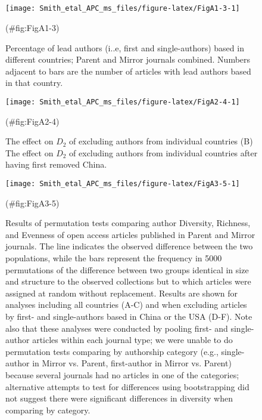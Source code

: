 \clearpage
\makeatletter
\efloat@restorefloats
\makeatother


\begin{appendix}
\section{}
\begin{figure}

{\centering \texttt{[image: Smith\_etal\_APC\_ms\_files/figure-latex/FigA1-3-1]} 

}

\caption{Percentage of lead authors (i..e, first and single-authors) based in different countries; Parent and Mirror journals combined. Numbers adjacent to bars are the number of articles with lead authors based in that country.}(\#fig:FigA1-3)
\end{figure}

\newpage
\blandscape

\begin{figure}

{\centering \texttt{[image: Smith\_etal\_APC\_ms\_files/figure-latex/FigA2-4-1]} 

}

\caption{The effect on $D_{2}$ of excluding authors from individual countries (B) The effect on $D_{2}$ of excluding authors from individual countries after having first removed China.}(\#fig:FigA2-4)
\end{figure}

\elandscape
\newpage

\begin{figure}

{\centering \texttt{[image: Smith\_etal\_APC\_ms\_files/figure-latex/FigA3-5-1]} 

}

\caption{Results of permutation tests comparing author Diversity, Richness, and Evenness of open access articles published in Parent and Mirror journals. The line indicates the observed difference between the two populations, while the bars represent the frequency in 5000 permutations of the difference between two groups identical in size and structure to the observed collections but to which articles were assigned at random without replacement. Results are shown for analyses including all countries (A-C) and when excluding articles by first- and single-authors based in China or the USA (D-F). Note also that these analyses were conducted by pooling first- and single-author articles within each journal type; we were unable to do permutation tests comparing by authorship category (e.g., single-author in Mirror vs. Parent, first-author in Mirror vs. Parent) because several journals had no articles in one of the categories; alternative attempts to test for differences using bootstrapping did not suggest there were significant differences in diversity when comparing by category.}(\#fig:FigA3-5)
\end{figure}


\end{appendix}
